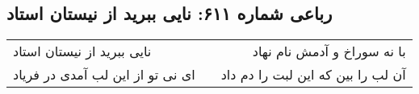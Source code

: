 \begin{center}
\section*{رباعی شماره ۶۱۱: نایی ببرید از نیستان استاد}
\label{sec:0611}
\begin{longtable}{l p{0.5cm} r}
نایی ببرید از نیستان استاد
&&
با نه سوراخ و آدمش نام نهاد
\\
ای نی تو از این لب آمدی در فریاد
&&
آن لب را بین که این لبت را دم داد
\\
\end{longtable}
\end{center}
